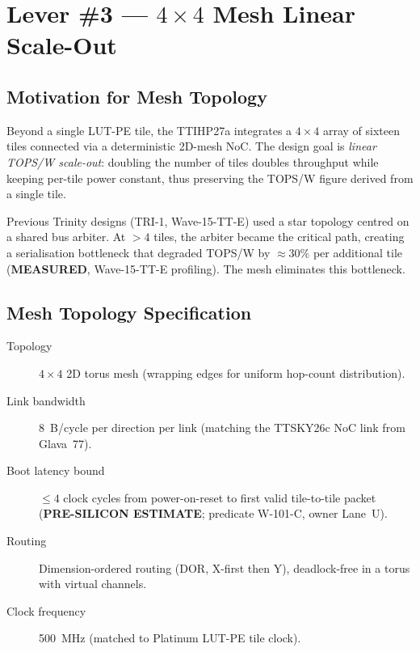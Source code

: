 \section{Lever \#3 --- \texorpdfstring{$4\times4$}{4×4} Mesh Linear Scale-Out}
\label{sec:lever3}

\subsection{Motivation for Mesh Topology}

Beyond a single LUT-PE tile, the TTIHP27a integrates a \(4\times4\) array of
sixteen tiles connected via a deterministic 2D-mesh NoC.  The design goal is
\emph{linear TOPS/W scale-out}: doubling the number of tiles doubles throughput
while keeping per-tile power constant, thus preserving the TOPS/W figure derived
from a single tile.

Previous Trinity designs (TRI-1, Wave-15-TT-E) used a star topology centred on
a shared bus arbiter.  At \(>4\) tiles, the arbiter became the critical path,
creating a serialisation bottleneck that degraded TOPS/W by \(\approx 30\%\)
per additional tile (\textbf{MEASURED}, Wave-15-TT-E profiling).  The mesh
eliminates this bottleneck.

\subsection{Mesh Topology Specification}

\begin{description}
  \item[Topology] \(4\times4\) 2D torus mesh (wrapping edges for uniform
    hop-count distribution).
  \item[Link bandwidth] 8~B/cycle per direction per link (matching the
    TTSKY26c NoC link from Glava~77).
  \item[Boot latency bound] \(\leq 4\) clock cycles from power-on-reset to
    first valid tile-to-tile packet (\textbf{PRE-SILICON ESTIMATE}; predicate
    W-101-C, owner Lane~U).
  \item[Routing] Dimension-ordered routing (DOR, X-first then Y), deadlock-free
    in a torus with virtual channels.
  \item[Clock frequency] 500~MHz (matched to Platinum LUT-PE tile clock).
\end{description}

